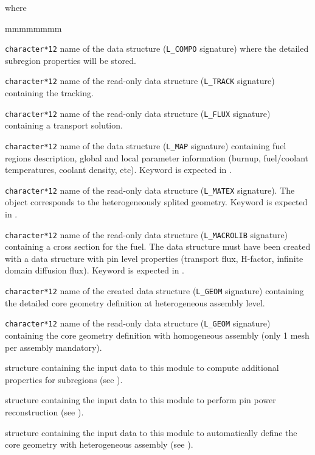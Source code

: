 \noindent
where
\begin{ListeDeDescription}{mmmmmmmm}

\item[\dusa{COMPO}] {\tt character*12} name of the  data
structure ({\tt L\_COMPO} signature) where the detailed subregion properties will be stored.

\item[\dusa{TRKNAM}] {\tt character*12} name of the read-only  data
structure ({\tt L\_TRACK} signature) containing the tracking. 

\item[\dusa{FLUNAM}] {\tt character*12} name of the read-only  data
structure ({\tt L\_FLUX} signature) containing a transport solution.

\item[\dusa{MAP}] {\tt character*12} name of the  data
structure ({\tt L\_MAP} signature) containing fuel regions description, global and
local parameter information (burnup, fuel/coolant temperatures, coolant density, etc).
Keyword  is expected in .

\item[\dusa{MATEX}] {\tt character*12} name of the read-only  data
structure ({\tt L\_MATEX} signature). The object corresponds to the heterogeneously splited geometry. Keyword  is expected in .

\item[\dusa{MACRES}] {\tt character*12} name of the read-only  data
structure ({\tt L\_MACROLIB} signature) containing a cross section for the fuel. The  data
structure must have been created with a  data structure with pin level properties (transport flux, H-factor, infinite domain diffusion flux). Keyword  is expected in .

\item[\dusa{GEONEW}] {\tt character*12} name of the created  data
structure ({\tt L\_GEOM} signature) containing the detailed core geometry definition at heterogeneous assembly level.

\item[\dusa{GEOOLD}] {\tt character*12} name of the read-only  data
structure ({\tt L\_GEOM} signature) containing the core geometry definition with homogeneous assembly (only 1 mesh per assembly mandatory).

\item[\dstr{descnap1}] structure containing the input data to this module to compute additional properties for subregions
(see ).

\item[\dstr{descnap2}] structure containing the input data to this module to perform pin power reconstruction
(see ).

\item[\dstr{descnap3}] structure containing the input data to this module to automatically define the core geometry with heterogeneous assembly
(see ).

\end{ListeDeDescription}

